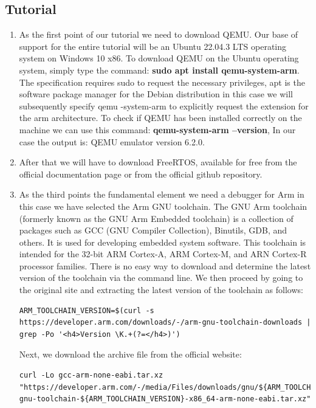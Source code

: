\documentclass[9pt, reqno]{amsart}
\theoremstyle{definition}
\theoremstyle{remark}
\numberwithin{equation}{section}
\begin{document}
{\subsection{Tutorial}
\begin{enumerate}
    \item As the first point of our tutorial we need to download QEMU. Our base of support for the entire tutorial will be an Ubuntu 22.04.3 LTS operating system on Windows 10 x86. To download QEMU on the Ubuntu operating system, simply type the command: \textbf{sudo apt install qemu-system-arm}. The specification requires sudo to request the necessary privileges, apt is the software package manager for the Debian distribution in this case we will subsequently specify qemu -system-arm to explicitly request the extension for the arm architecture. To check if QEMU has been installed correctly on the machine we can use this command: \textbf{qemu-system-arm --version}, In our case the output is: QEMU emulator version 6.2.0. 
    \item After that we will have to download FreeRTOS, available for free from the official documentation page \cite{download1} or from the official github repository\cite{download2}. 
    \item As the third points the fundamental element we need a debugger for Arm in this case we have selected the Arm GNU toolchain\cite{toolchain}. The GNU Arm toolchain (formerly known as the GNU Arm Embedded toolchain) is a collection of packages such as GCC (GNU Compiler Collection), Binutils, GDB, and others. It is used for developing embedded system software. This toolchain is intended for the 32-bit ARM Cortex-A, ARM Cortex-M, and ARN Cortex-R processor families. There is no easy way to download and determine the latest version of the toolchain via the command line. We then proceed by going to the original site and extracting the latest version of the toolchain as follows: 
    \begin{lstlisting}[breaklines=true, basicstyle=\bfseries,basicstyle=\small]
    ARM_TOOLCHAIN_VERSION=$(curl -s https://developer.arm.com/downloads/-/arm-gnu-toolchain-downloads | grep -Po '<h4>Version \K.+(?=</h4>)')
    \end{lstlisting}
    Next, we download the archive file from the official website:
    \begin{lstlisting}[breaklines=true, basicstyle=\bfseries,basicstyle=\small]
    curl -Lo gcc-arm-none-eabi.tar.xz "https://developer.arm.com/-/media/Files/downloads/gnu/${ARM_TOOLCHAIN_VERSION}/binrel/arm-gnu-toolchain-${ARM_TOOLCHAIN_VERSION}-x86_64-arm-none-eabi.tar.xz"\end{lstlisting}

\end{enumerate}}
\end{document}
